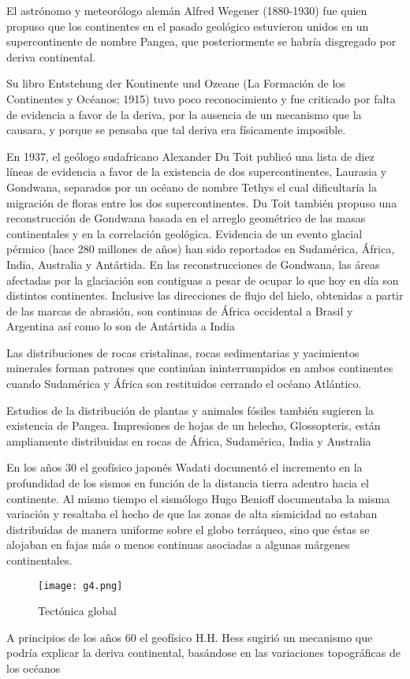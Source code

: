 El astrónomo y meteorólogo alemán Alfred Wegener (1880-1930) fue quien propuso que los continentes en el pasado geológico estuvieron unidos en un supercontinente de nombre Pangea, que posteriormente se habría disgregado por deriva continental.

Su libro Entstehung der Kontinente und Ozeane (La Formación de los Continentes y Océanos; 1915) tuvo poco reconocimiento y fue criticado por falta de evidencia a favor de la deriva, por la ausencia de un mecanismo que la causara, y porque se pensaba que tal deriva era físicamente imposible.

En 1937, el geólogo sudafricano Alexander Du Toit publicó una lista de diez líneas de evidencia a favor de la existencia de dos supercontinentes, Laurasia y Gondwana, separados por un océano de nombre Tethys el cual dificultaría la migración de floras entre los dos supercontinentes. Du Toit también propuso una reconstrucción de Gondwana basada en el arreglo geométrico de las masas continentales y en la correlación geológica.
Evidencia de un evento glacial pérmico (hace 280 millones de años) han sido reportados en Sudamérica, África, India, Australia y Antártida. En las reconstrucciones de Gondwana, las áreas afectadas por la glaciación son contiguas a pesar de ocupar lo que hoy en día son distintos continentes. Inclusive las direcciones de flujo del hielo, obtenidas a partir de las marcas de abrasión, son continuas de África occidental a Brasil y Argentina así como lo son de Antártida a India

Las distribuciones de rocas cristalinas, rocas sedimentarias y yacimientos minerales forman patrones que continúan ininterrumpidos en ambos continentes cuando Sudamérica y África son restituidos cerrando el océano Atlántico.

Estudios de la distribución de plantas y animales fósiles también sugieren la existencia de Pangea. Impresiones de hojas de un helecho, Glossopteris, están ampliamente distribuidas en rocas de África, Sudamérica, India y Australia

En los años 30 el geofísico japonés Wadati documentó el incremento en la profundidad de los sismos en función de la distancia tierra adentro hacia el continente. Al mismo tiempo el sismólogo Hugo Benioff documentaba la misma variación y resaltaba el hecho de que las zonas de alta sismicidad no estaban distribuidas de manera uniforme sobre el globo terráqueo, sino que éstas se alojaban en fajas más o menos continuas asociadas a algunas márgenes continentales.
\begin{figure}[h!]
\centering
  \texttt{[image: g4.png]}
  \caption{Tectónica global}
  \label{g4}
\end{figure}
A principios de los años 60 el geofísico H.H. Hess sugirió un mecanismo que podría explicar la deriva continental, basándose en las variaciones topográficas de los océanos

